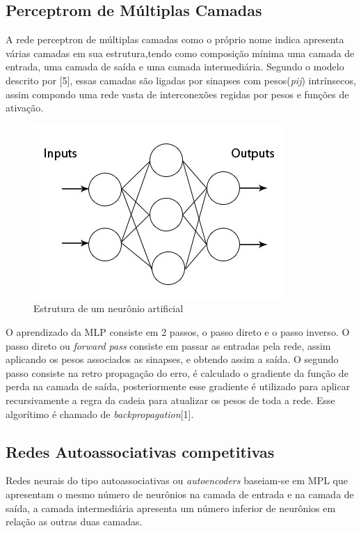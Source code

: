 \subsection{Perceptrom de Múltiplas Camadas}
A rede perceptron de múltiplas camadas como o próprio nome indica apresenta várias camadas em sua estrutura,tendo como composição mínima uma camada de entrada, uma camada de saída e uma camada intermediária. Segundo o modelo descrito por [5], essas camadas são ligadas por sinapses com pesos(\textit{pij}) intrínsecos, assim compondo uma rede vasta de interconexões regidas por pesos e funções de ativação.
\begin{figure}[H]

\centering %
\includegraphics[width=\columnwidth]{04-Figuras/MLP_estrurura}
\caption{Estrutura de um neurônio artificial}

\label{figura:Arquitetura de uma rede MLP}

\end{figure}

O aprendizado da MLP consiste em 2 passos, o passo direto e o passo inverso. O passo direto ou \textit{forward pass} consiste em passar as entradas pela rede, assim aplicando os pesos associados as sinapses, e obtendo assim a saída. O segundo passo consiste na retro propagação do erro, é calculado o gradiente da função de perda na camada de saída, posteriormente esse gradiente é utilizado para aplicar recursivamente a regra da cadeia para atualizar os pesos de toda a rede.
Esse algorítimo é chamado de \textit{backpropagation}[1].

\subsection{Redes Autoassociativas competitivas}
Redes neurais do tipo autoassociativas ou \textit{autoencoders} baseiam-se em MPL que apresentam o mesmo número de neurônios na camada de entrada e na camada de saída, a camada intermediária apresenta um número inferior de neurônios em relação as outras duas camadas. 

